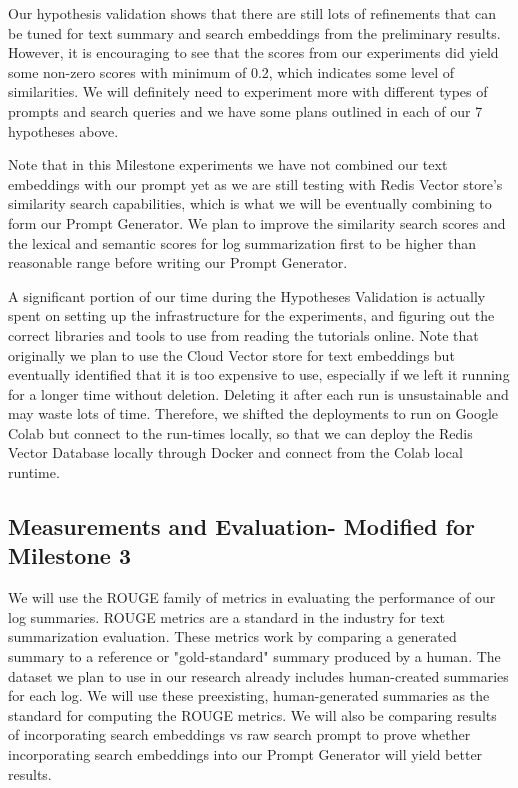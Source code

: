 \documentclass[conference]{IEEEtran}
\begin{document}
Our hypothesis validation shows that there are still lots of refinements that can be tuned for text summary and search embeddings from the preliminary results. However, it is encouraging to see that the scores from our experiments did yield some non-zero scores with minimum of 0.2, which indicates some level of similarities. We will definitely need to experiment more with different types of prompts and search queries and we have some plans outlined in each of our 7 hypotheses above.

Note that in this Milestone experiments we have not combined our text embeddings with our prompt yet as we are still testing with Redis Vector store's similarity search capabilities, which is what we will be eventually combining to form our Prompt Generator. We plan to improve the similarity search scores and the lexical and semantic scores for log summarization first to be higher than reasonable range before writing our Prompt Generator.

A significant portion of our time during the Hypotheses Validation is actually spent on setting up the infrastructure for the experiments, and figuring out the correct libraries and tools to use from reading the tutorials online. Note that originally we plan to use the Cloud Vector store for text embeddings but eventually identified that it is too expensive to use, especially if we left it running for a longer time without deletion. Deleting it after each run is unsustainable and may waste lots of time. Therefore, we shifted the deployments to run on Google Colab but connect to the run-times locally, so that we can deploy the Redis Vector Database locally through Docker and connect from the Colab local runtime. 

\subsection{Measurements and Evaluation- Modified for Milestone 3}


We will use the ROUGE family of metrics in evaluating the performance of our log summaries. \cite{lin2004rouge} ROUGE metrics are a standard in the industry for text summarization evaluation. These metrics work by comparing a generated summary to a reference or "gold-standard" summary produced by a human. The dataset we plan to use in our research already includes human-created summaries for each log. We will use these preexisting, human-generated summaries as the standard for computing the ROUGE metrics.
We will also be comparing results of incorporating search embeddings vs raw search prompt to prove whether incorporating search embeddings into our Prompt Generator will yield better results.
\end{document}
